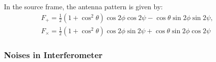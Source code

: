 \documentclass{ttuthes2007}
\begin{document}
In the source frame, the antenna pattern is given by:
\begin{align}
F_+=\frac{1}{2}(1+\cos^2\theta)\cos2\phi\cos2\psi-\cos\theta\sin2\phi\sin2\psi,\\
F_\times=\frac{1}{2}(1+\cos^2\theta)\cos2\phi\sin2\psi+\cos\theta\sin2\phi\cos2\psi
\end{align}

\subsubsection{Noises in Interferometer}
\end{document}
